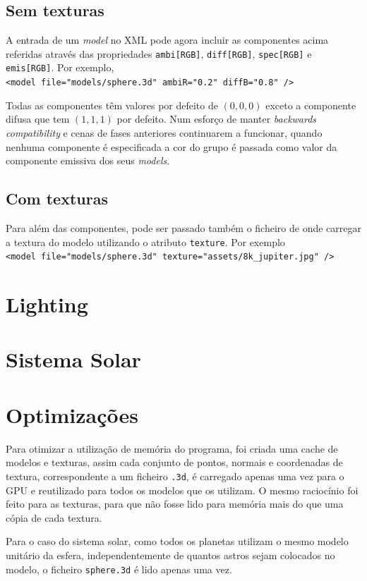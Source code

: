 \documentclass[a4paper]{article}
\begin{document}
\subsection{Sem texturas}
A entrada de um \textit{model} no XML pode agora incluir as componentes acima
referidas através das propriedades \texttt{ambi[RGB]}, \texttt{diff[RGB]},
\texttt{spec[RGB]} e \texttt{emis[RGB]}. Por exemplo,\\
\verb!<model file="models/sphere.3d" ambiR="0.2" diffB="0.8" />!

Todas as componentes têm valores por defeito de $(0,0,0)$ exceto a componente
difusa que tem $(1,1,1)$ por defeito. Num esforço de manter \textit{backwards
compatibility} e cenas de fases anteriores continuarem a funcionar, quando
nenhuma componente é especificada a cor do grupo é passada como valor da
componente emissiva dos seus \textit{models}.

\subsection{Com texturas}

Para além das componentes, pode ser passado também o ficheiro de onde carregar
a textura do modelo utilizando o atributo \texttt{texture}. Por exemplo\\
\verb!<model file="models/sphere.3d" texture="assets/8k_jupiter.jpg" />!

\section{Lighting}

\section{Sistema Solar}

\section{Optimizações}
Para otimizar a utilização de memória do programa, foi criada uma cache de
modelos e texturas, assim cada conjunto de pontos, normais e coordenadas de
textura, correspondente a um ficheiro \texttt{.3d}, é carregado apenas uma vez
para o GPU e reutilizado para todos os modelos que os utilizam. O mesmo
raciocínio foi feito para as texturas, para que não fosse lido para memória
mais do que uma cópia de cada textura.

Para o caso do sistema solar, como todos os planetas utilizam o mesmo modelo
unitário da esfera, independentemente de quantos astros sejam colocados no
modelo, o ficheiro \texttt{sphere.3d} é lido apenas uma vez.
\end{document}

